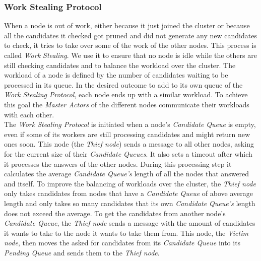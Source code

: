 \subsubsection{Work Stealing Protocol}\label{protocol:workStealing}
When a node is out of work, either because it just joined the cluster or because all the candidates it checked got pruned and did not generate any new candidates to check, it tries to take over some of the work of the other nodes. 
This process is called \emph{Work Stealing}.
We use it to ensure that no node is idle while the others are still checking candidates and to balance the workload over the cluster. 
The workload of a node is defined by the number of candidates waiting to be processed in its queue. 
In the desired outcome to add to its own queue of the \emph{Work Stealing Protocol}, each node ends up with a similar workload. 
To achieve this goal the \emph{Master Actors} of the different nodes communicate their workloads with each other.\\
The \emph{Work Stealing Protocol} is initiated when a node's \emph{Candidate Queue} is empty, even if some of its workers are still processing candidates and might return new ones soon.
This node (the \emph{Thief node}) sends a message to all other nodes, asking for the current size of their \emph{Candidate Queues}.
It also sets a timeout after which it processes the answers of the other nodes. 
During this processing step it calculates the average \emph{Candidate Queue's} length of all the nodes that answered and itself.
To improve the balancing of workloads over the cluster, the \emph{Thief node} only takes candidates from nodes that have a \emph{Candidate Queue} of above average length and only takes so many candidates that its own \emph{Candidate Queue's} length does not exceed the average. 
To get the candidates from another node's \emph{Candidate Queue}, the \emph{Thief node} sends a message with the amount of candidates it wants to take to the node it wants to take them from.
This node, the \emph{Victim node}, then moves the asked for candidates from its \emph{Candidate Queue} into its \emph{Pending Queue} and sends them to the \emph{Thief node}.
